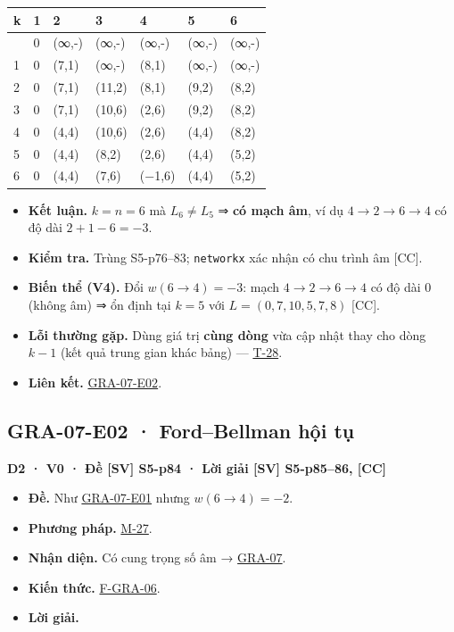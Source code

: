 \documentclass[
  10pt,
  twoside,openany]{book}
\providecommand{\tightlist}{%
  \setlength{\itemsep}{0pt}\setlength{\parskip}{0pt}}
\begin{document}
\begin{longtable}[]{@{}lllllll@{}}
\toprule\noalign{}
k & 1 & 2 & 3 & 4 & 5 & 6 \\
\midrule\noalign{}
\endhead
\bottomrule\noalign{}
\endlastfoot
0 & 0 & (∞,-) & (∞,-) & (∞,-) & (∞,-) & (∞,-) \\
1 & 0 & (7,1) & (∞,-) & (8,1) & (∞,-) & (∞,-) \\
2 & 0 & (7,1) & (11,2) & (8,1) & (9,2) & (8,2) \\
3 & 0 & (7,1) & (10,6) & (2,6) & (9,2) & (8,2) \\
4 & 0 & (4,4) & (10,6) & (2,6) & (4,4) & (8,2) \\
5 & 0 & (4,4) & (8,2) & (2,6) & (4,4) & (5,2) \\
6 & 0 & (4,4) & (7,6) & (−1,6) & (4,4) & (5,2) \\
\end{longtable}

\begin{itemize}
\tightlist
\item
  \textbf{Kết luận.} \(k=n=6\) mà \(L_6\ne L_5\) ⇒ \textbf{có mạch âm},
  ví dụ \(4\to2\to6\to4\) có độ dài \(2+1-6=-3\).
\item
  \textbf{Kiểm tra.} Trùng S5-p76--83; \texttt{networkx} xác nhận có chu
  trình âm {[}CC{]}.
\item
  \textbf{Biến thể (V4).} Đổi \(w(6\to4)=-3\): mạch \(4\to2\to6\to4\) có
  độ dài \(0\) (không âm) ⇒ ổn định tại \(k=5\) với \(L=(0,7,10,5,7,8)\)
  {[}CC{]}.
\item
  \textbf{Lỗi thường gặp.} Dùng giá trị \textbf{cùng dòng} vừa cập nhật
  thay cho dòng \(k-1\) (kết quả trung gian khác bảng) ---
  \protect\hyperlink{T-28}{T-28}.
\item
  \textbf{Liên kết.} \protect\hyperlink{GRA-07-E02}{GRA-07-E02}.
\end{itemize}

\hypertarget{GRA-07-E02}{%
\subsection{GRA-07-E02 · Ford--Bellman hội tụ}\label{GRA-07-E02}}

\textbf{D2 · V0 · Đề {[}SV{]} S5-p84 · Lời giải {[}SV{]} S5-p85--86,
{[}CC{]}}

\begin{itemize}
\tightlist
\item
  \textbf{Đề.} Như \protect\hyperlink{GRA-07-E01}{GRA-07-E01} nhưng
  \(w(6\to4)=-2\).
\item
  \textbf{Phương pháp.} \protect\hyperlink{M-27}{M-27}.
\item
  \textbf{Nhận diện.} Có cung trọng số âm →
  \protect\hyperlink{GRA-07}{GRA-07}.
\item
  \textbf{Kiến thức.} \protect\hyperlink{F-GRA-06}{F-GRA-06}.
\item
  \textbf{Lời giải.}
\end{itemize}
\end{document}
